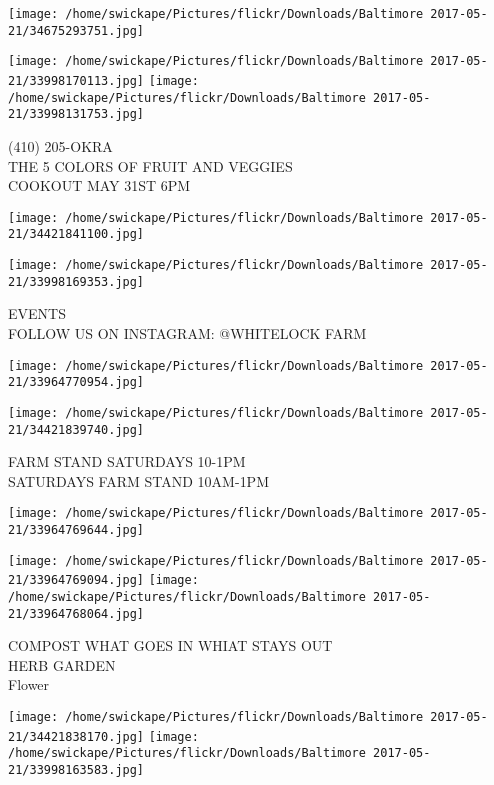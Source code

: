 \documentclass[10pt,letterpaper]{article}
\begin{document}
\texttt{[image: /home/swickape/Pictures/flickr/Downloads/Baltimore 2017-05-21/34675293751.jpg]}

\vspace{0.25in}
\texttt{[image: /home/swickape/Pictures/flickr/Downloads/Baltimore 2017-05-21/33998170113.jpg]}
\texttt{[image: /home/swickape/Pictures/flickr/Downloads/Baltimore 2017-05-21/33998131753.jpg]}

(410) 205{-}OKRA\\
THE 5 COLORS OF FRUIT AND VEGGIES\\
COOKOUT MAY 31ST 6PM\\
\pagebreak

\texttt{[image: /home/swickape/Pictures/flickr/Downloads/Baltimore 2017-05-21/34421841100.jpg]}

\vspace{0.25in}
\texttt{[image: /home/swickape/Pictures/flickr/Downloads/Baltimore 2017-05-21/33998169353.jpg]}

EVENTS\\
FOLLOW US ON INSTAGRAM: @WHITELOCK FARM\\
\pagebreak

\texttt{[image: /home/swickape/Pictures/flickr/Downloads/Baltimore 2017-05-21/33964770954.jpg]}

\vspace{0.25in}
\texttt{[image: /home/swickape/Pictures/flickr/Downloads/Baltimore 2017-05-21/34421839740.jpg]}

FARM STAND SATURDAYS 10{-}1PM\\
SATURDAYS FARM STAND 10AM{-}1PM\\
\pagebreak

\texttt{[image: /home/swickape/Pictures/flickr/Downloads/Baltimore 2017-05-21/33964769644.jpg]}

\vspace{0.25in}
\texttt{[image: /home/swickape/Pictures/flickr/Downloads/Baltimore 2017-05-21/33964769094.jpg]}
\texttt{[image: /home/swickape/Pictures/flickr/Downloads/Baltimore 2017-05-21/33964768064.jpg]}

COMPOST WHAT GOES IN WHIAT STAYS OUT\\
HERB GARDEN\\
Flower\\
\pagebreak

\texttt{[image: /home/swickape/Pictures/flickr/Downloads/Baltimore 2017-05-21/34421838170.jpg]}
\texttt{[image: /home/swickape/Pictures/flickr/Downloads/Baltimore 2017-05-21/33998163583.jpg]}
\end{document}
